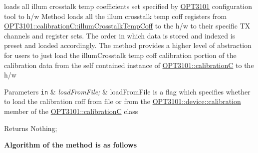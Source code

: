 loads all illum crosstalk temp coefficients set specified by \mbox{\hyperlink{namespace_o_p_t3101}{O\+P\+T3101}} configuration tool to h/w Method loads all the illum crosstalk temp coff registers from \mbox{\hyperlink{class_o_p_t3101_1_1calibration_c_ac7bcc22317965bb378479fb016c20d3c}{O\+P\+T3101\+::calibration\+C\+::illum\+Crosstalk\+Temp\+Coff}} to the h/w to their specific TX channels and register sets. The order in which data is stored and indexed is preset and loaded accordingly. The method provides a higher level of abstraction for users to just load the illum\+Crosstalk temp coff calibration portion of the calibration data from the self contained instance of \mbox{\hyperlink{class_o_p_t3101_1_1calibration_c}{O\+P\+T3101\+::calibrationC}} to the h/w 


\begin{DoxyParams}[1]{Parameters}
\mbox{\tt in}  & {\em load\+From\+File;} & load\+From\+File is a flag which specifies whether to load the calibration coff from file or from the \mbox{\hyperlink{class_o_p_t3101_1_1device_a808c6e99f30fc4f21bee018f351f560d}{O\+P\+T3101\+::device\+::calibration}} member of the \mbox{\hyperlink{class_o_p_t3101_1_1calibration_c}{O\+P\+T3101\+::calibrationC}} class \\
\hline
\end{DoxyParams}
\begin{DoxyReturn}{Returns}
Nothing; 
\end{DoxyReturn}
{\bfseries Algorithm of the method is as follows}


